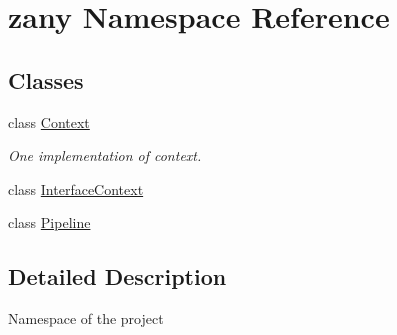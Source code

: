 \hypertarget{namespacezany}{}\section{zany Namespace Reference}
\label{namespacezany}
\subsection*{Classes}
\begin{DoxyCompactItemize}
\item 
class \hyperlink{classzany_1_1_context}{Context}
\begin{DoxyCompactList}\small\item\em One implementation of context. \end{DoxyCompactList}\item 
class \hyperlink{classzany_1_1_interface_context}{Interface\+Context}
\item 
class \hyperlink{classzany_1_1_pipeline}{Pipeline}
\end{DoxyCompactItemize}


\subsection{Detailed Description}
Namespace of the project 